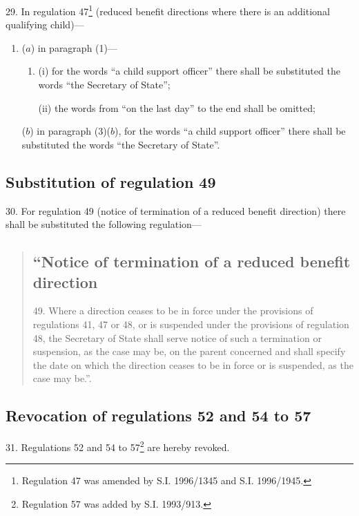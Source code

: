 \documentclass[12pt,a4paper]{article}
\begin{document}
29.  In regulation 47\footnote{\frenchspacing Regulation 47 was amended by S.I. 1996/1345 and S.I. 1996/1945.} (reduced benefit directions where there is an additional qualifying child)---
\begin{enumerate}\item[]
($a$) in paragraph (1)---
\begin{enumerate}\item[]
(i) for the words “a child support officer” there shall be substituted the words “the Secretary of State”;

(ii) the words from “on the last day” to the end shall be omitted;
\end{enumerate}

($b$) in paragraph (3)($b$), for the words “a child support officer” there shall be substituted the words “the Secretary of State”.
\end{enumerate}

\subsection[30. Substitution of regulation 49]{Substitution of regulation 49}

30.  For regulation 49 (notice of termination of a reduced benefit direction) there shall be substituted the following regulation---
\begin{quotation}
\subsection*{“Notice of termination of a reduced benefit direction}

49.  Where a direction ceases to be in force under the provisions of regulations 41, 47 or 48, or is suspended under the provisions of regulation 48, the Secretary of State shall serve notice of such a termination or suspension, as the case may be, on the parent concerned and shall specify the date on which the direction ceases to be in force or is suspended, as the case may be.”.
\end{quotation}

\subsection[31. Revocation of regulations 52 and 54 to 57]{Revocation of regulations 52 and 54 to 57}

31.  Regulations 52 and 54 to 57\footnote{\frenchspacing Regulation 57 was added by S.I. 1993/913.} are hereby revoked.
\end{document}
